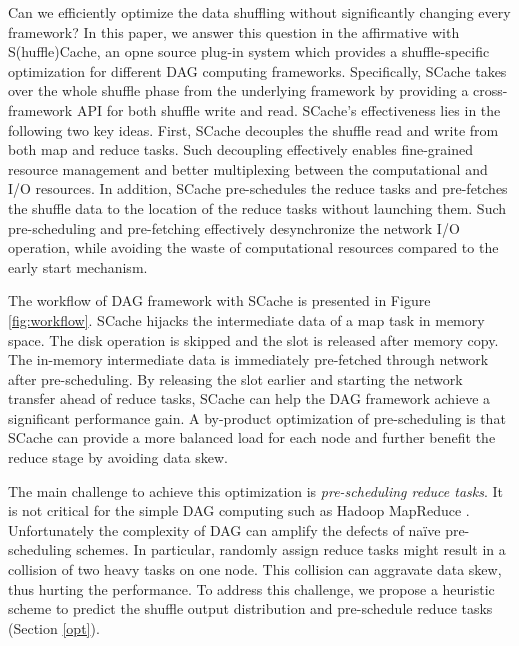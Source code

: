 Can we efficiently optimize the data shuffling without significantly changing every framework?
In this paper, we answer this question in the affirmative with S(huffle)Cache, an opne source plug-in system which provides a shuffle-specific optimization for different DAG computing frameworks.
Specifically, SCache takes over the whole shuffle phase from the underlying framework by providing a cross-framework API for both shuffle write and read.
SCache's effectiveness lies in the following two key ideas.
First, SCache decouples the shuffle read and write from both map and reduce tasks.
Such decoupling effectively enables fine-grained resource management and better multiplexing between the computational and I/O resources.
In addition, SCache pre-schedules the reduce tasks and pre-fetches the shuffle data to the location of the reduce tasks without launching them.
Such pre-scheduling and pre-fetching effectively desynchronize the network I/O operation, while avoiding the waste of computational resources compared to the early start mechanism.

The workflow of DAG framework with SCache is presented in Figure \ref{fig:workflow}. SCache hijacks the intermediate data of a map task in memory space. The disk operation is skipped and the slot is released after memory copy. The in-memory intermediate data is immediately pre-fetched through network after pre-scheduling. By releasing the slot earlier and starting the network transfer ahead of reduce tasks, SCache can help the DAG framework achieve a significant performance gain. A by-product optimization of pre-scheduling is that SCache can provide a more balanced load for each node and further benefit the reduce stage by avoiding data skew.

The main challenge to achieve this optimization is \textit{pre-scheduling reduce tasks}. It is not critical for the simple DAG computing such as Hadoop MapReduce \cite{mapreduce}. Unfortunately the complexity of DAG can amplify the defects of na\"{i}ve pre-scheduling schemes. In particular, randomly assign reduce tasks might result in a collision of two heavy tasks on one node. This collision can aggravate data skew, thus hurting the performance. To address this challenge, we propose a heuristic scheme to predict the shuffle output distribution and pre-schedule reduce tasks (Section \ref{opt}).

